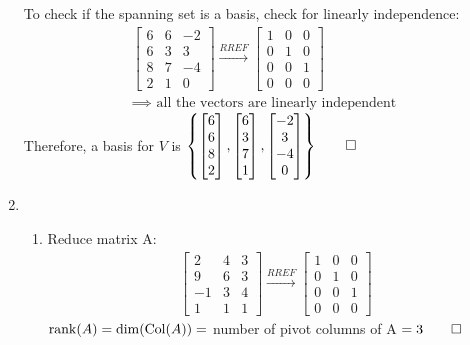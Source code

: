 \documentclass[12pt, a4paper]{article}
\begin{document}
\begin{enumerate}[Q\arabic*.]
  To check if the spanning set is a basis, check for linearly independence:
  \begin{gather*}
    \begin{bmatrix}
      6 & 6 & -2\\
      6 & 3 & 3\\
      8 & 7 & -4\\
      2 & 1 & 0
    \end{bmatrix}\xrightarrow{RREF}
    \begin{bmatrix}
      1 & 0 & 0\\
      0 & 1 & 0\\
      0 & 0 & 1\\
      0 & 0 & 0
    \end{bmatrix}\\
    \implies \text{ all the vectors are linearly independent}
  \end{gather*}
  Therefore, a basis for $V$ is $\left\{\begin{bmatrix}6\\6\\8\\2\end{bmatrix}, \begin{bmatrix}6\\3\\7\\1\end{bmatrix}, \begin{bmatrix}-2\\3\\-4\\0\end{bmatrix}\right\} \qed$

  \pagebreak
  \item
    \begin{enumerate}[(\alph*)]
      \item Reduce matrix A:
        \begin{align*}
          \begin{bmatrix}
            2 & 4 & 3\\
            9 & 6 & 3\\
            -1 & 3 & 4\\
            1 & 1 & 1
          \end{bmatrix}\xrightarrow{RREF}
          \begin{bmatrix}
            1 & 0 & 0\\
            0 & 1 & 0\\
            0 & 0 & 1\\
            0 & 0 & 0
          \end{bmatrix}
        \end{align*}
        $\operatorname{rank}(A) = \dim(\operatorname{Col}(A)) =$ number of pivot columns of A $ = 3\qed$


\end{enumerate}
\end{enumerate}
\end{document}
